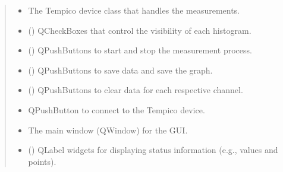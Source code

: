 \documentclass[letterpaper,10pt,english]{sphinxmanual}
\begin{document}
\begin{fulllineitems}
\begin{quote}
\begin{description}
\begin{itemize}
\item {} 
\sphinxAtStartPar
{} \textendash{} The Tempico device class that handles the measurements.

\item {} 
\sphinxAtStartPar
{} (\sphinxstyleliteralemphasis{\sphinxupquote{, }}\sphinxstyleliteralemphasis{\sphinxupquote{, }}\sphinxstyleliteralemphasis{\sphinxupquote{,}}) \textendash{} QCheckBoxes that control the visibility of each histogram.

\item {} 
\sphinxAtStartPar
{} (\sphinxstyleliteralemphasis{\sphinxupquote{,}}) \textendash{} QPushButtons to start and stop the measurement process.

\item {} 
\sphinxAtStartPar
{} (\sphinxstyleliteralemphasis{\sphinxupquote{,}}) \textendash{} QPushButtons to save data and save the graph.

\item {} 
\sphinxAtStartPar
{} (\sphinxstyleliteralemphasis{\sphinxupquote{, }}\sphinxstyleliteralemphasis{\sphinxupquote{, }}\sphinxstyleliteralemphasis{\sphinxupquote{,}}) \textendash{} QPushButtons to clear data for each respective channel.

\item {} 
\sphinxAtStartPar
{} \textendash{} QPushButton to connect to the Tempico device.

\item {} 
\sphinxAtStartPar
{} \textendash{} The main window (QWindow) for the GUI.

\item {} 
\sphinxAtStartPar
{} (\sphinxstyleliteralemphasis{\sphinxupquote{,}}) \textendash{} QLabel widgets for displaying status information (e.g., values and points).


\end{itemize}
\end{description}
\end{quote}
\end{fulllineitems}
\end{document}
